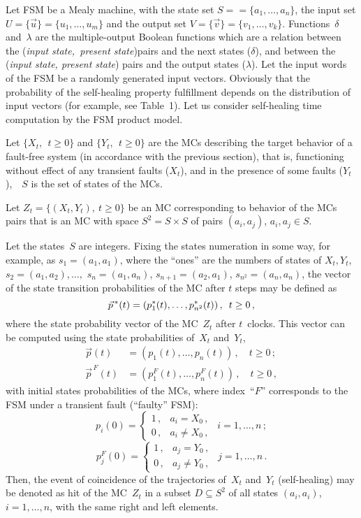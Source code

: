 \begin{multicols}{2}
Let FSM be a Mealy machine, with the state set
$S=$\linebreak $=\{a_1,\ldots,a_n\}$,
the input set $U=\{\vec u\}=\{u_1,\ldots, u_m\}$
and the output set $V=\{\vec v\}=\{v_1,\ldots, v_k\}$.
Functions~$\delta$ and~$\lambda$ are the multiple-output Boolean
functions which are a relation between the ({\it input state,\,
present state})\linebreak pairs and the next states ($\delta$),
and between the (\textit{input state, present state}) pairs
and the output states ($\lambda$).
Let the input words of the FSM be a randomly generated
input vectors.
Obviously that the probability of the self-healing property
fulfillment depends on the distribution of input vectors
(for example, see Table~1).
Let us consider self-healing time
computation by the FSM product model.

Let $\{X_t,\ \ t\ge0\}$ and $\{Y_t,\ \  t\ge0\}$ are the MCs
describing the target behavior of a fault-free system  (in
accordance with the previous section), that is, functioning without
effect of any transient faults ($X_t$), and in the presence of
some faults ($Y_t$),\ \ $S$ is the set of states of the MCs.

Let $Z_t=\{(X_t,Y_t), \ t\ge0\}$ be an MC corresponding to
behavior of the MCs pairs that is an MC with space
$S^2=S\times S$ of pairs $(a_i,a_j)$, $a_i,a_j\in S$.

Let the states~$S$ are integers.
Fixing  the states numeration in  some way,
for example, as $s_1=(a_1,a_1)$,
where the ``ones'' are the numbers of states of
$X_t,Y_t$,  $s_2=(a_1,a_2),\ldots,$  $s_n=(a_1,a_n)$,
$s_{n+1}=(a_2,a_1)$, $s_{n^2}=(a_n,a_n)$,
the vector of the state transition probabilities of
the MC after $t$ steps may be defined as
$$
\vec p^{\,*}(t)=(p_{1}^*(t),\ldots,p_{n^2}^*(t))\,,
\enskip t\ge 0\,,
$$
where the state probability vector of the MC~$Z_t$
after $t$~clocks.
 This vector can be computed using the state
probabilities of~$X_t$ and~$Y_t$,
\begin{align*}
\vec p(t)&=(p_{1}(t),\ldots,p_{n}(t))\,,
\quad  t\ge 0\,;
\\
\vec p^{\,F}(t)&=(p_{1}^F(t),\ldots,p_{n}^F(t))\,,
\quad t\ge 0\,,
\end{align*}
with initial  states probabilities of the MCs,
where index~``$F$'' corresponds to the  FSM under
a transient fault (``faulty'' FSM):
$$
p_{i}(0)
=
\begin{cases}
1\,,      &a_i=X_0\,,   \\
0\,,      &a_i\ne X_0\,,
\end{cases}
\ \ i=1,\ldots ,n\,;
$$
$$
p^F_{j}(0)
=
\begin{cases}
1\,,      &a_j=Y_0\,,   \\
0\,,      &a_j\ne Y_0\,,
\end{cases}
\ \ j=1,\ldots ,n\,.
$$
Then,  the event of coincidence of the
trajectories of~$X_t$ and~$Y_t$ (self-healing)
may be denoted as hit
of the MC~$Z_t$ in a subset $D \subseteq S^2$ of all
states $(a_i,a_i)$,\ \ $i=1,\ldots,n$, with the same
right and left elements.


\end{multicols}
